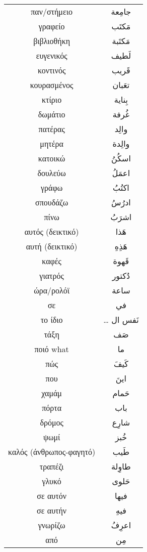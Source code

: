 \documentclass[twocolumn,a4paper]{article}
\newcommand{\ar}[1]{\textarabic{#1}}
\begin{document}
\begin{supertabular}{ c c }
παν/στήμειο & \ar{ جامِعة } \\
γραφείο     & \ar{ مَكتَب } \\
βιβλιοθήκη  & \ar{ مَكتَبة } \\
ευγενικός   & \ar{ لَطيف } \\
κοντινός    & \ar{ قَريب } \\
κουρασμένος & \ar{ تعَبان } \\
κτίριο      & \ar{ بِناية } \\
δωμάτιο     & \ar{ غُرفة } \\
πατέρας     & \ar{ والِد} \\
μητέρα      & \ar{ والِدة } \\
κατοικώ     & \ar{ اسكُنُ } \\
δουλεύω     & \ar{ اعمَلُ } \\
γράφω       & \ar{ اكتُبُ } \\
σπουδάζω    & \ar{ ادرُسُ } \\
πίνω        & \ar{ اشرَبُ } \\
αυτός (δεικτικό) & \ar{ هَذا } \\
αυτή (δεικτικό)  & \ar{ هَذِهِ } \\
καφές       & \ar{ قَهوة } \\
γιατρός     & \ar{ دُكتور } \\
ώρα/ρολόϊ   & \ar{ ساعة} \\
σε          & \ar{ في } \\
το ίδιο     & \dots\ar{ نَفس ال } \\
τάξη        & \ar{ صَف } \\
ποιό  what  & \ar{ ما } \\
πώς         & \ar{ كَيفَ } \\
που         & \ar{ اينَ } \\
χαμάμ       & \ar{ حَمام } \\
πόρτα       & \ar{ باب } \\
δρόμος      & \ar{ شارِع } \\
ψωμί        & \ar{ خُبز } \\
καλός (άνθρωπος-φαγητό) & \ar{ طَيب } \\
τραπέζι     & \ar{ طاوِلة } \\
γλυκό       & \ar{ حَلوى } \\
σε αυτόν    & \ar{ فيها } \\
σε αυτήν    & \ar{ فيهِ } \\
γνωρίζω     & \ar{ اعرِفُ } \\
από         & \ar{ مِن } \\

\end{supertabular}
\end{document}
